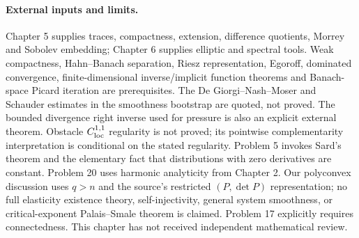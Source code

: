 \paragraph{External inputs and limits.}
Chapter 5 supplies traces, compactness, extension, difference quotients,
Morrey and Sobolev embedding; Chapter 6 supplies elliptic and spectral tools.
Weak compactness, Hahn--Banach separation, Riesz representation,
Egoroff, dominated convergence, finite-dimensional inverse/implicit
function theorems and Banach-space Picard iteration are prerequisites.
The De Giorgi--Nash--Moser and Schauder estimates in the smoothness
bootstrap are quoted, not proved. The bounded divergence right inverse
used for pressure is also an explicit external theorem. Obstacle
$C^{1,1}_{\rm loc}$ regularity is not proved; its pointwise complementarity
interpretation is conditional on the stated regularity. Problem 5 invokes
Sard's theorem and the elementary fact that distributions with zero
derivatives are constant. Problem 20 uses harmonic analyticity from
Chapter 2. Our polyconvex discussion uses $q>n$ and the source's restricted
$(P,\det P)$ representation; no full elasticity existence theory,
self-injectivity, general system smoothness, or critical-exponent
Palais--Smale theorem is claimed. Problem 17 explicitly requires connectedness.
This chapter has not received independent mathematical review.
